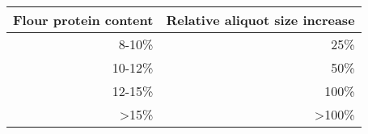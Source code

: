


\begin{tabular}{|r|r|}
\hline
\multicolumn{1}{|l|}{\textbf{Flour protein content}} & \multicolumn{1}{l|}{\textbf{Relative aliquot size increase}} \\ \hline
8-10\%                                               & 25\%                                                         \\ \hline
10-12\%                                              & 50\%                                                         \\ \hline
12-15\%                                              & 100\%                                                        \\ \hline
\textgreater 15\%                                    & \textgreater 100\%                                           \\ \hline
\end{tabular}


